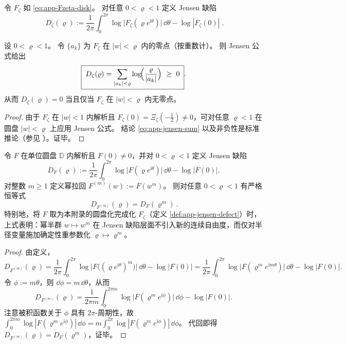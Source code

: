 \begin{definition}[Jensen 缺陷]\label{def:app-jensen-defect}
令 \(F_{\zeta}\) 如 \eqref{eq:app-Fzeta-disk}。
对任意 \(0<\varrho<1\) 定义 Jensen 缺陷
\begin{equation}\label{eq:app-jensen-defect}
\boxed{\;
D_{\zeta}(\varrho)
:=\frac{1}{2\pi}\int_{0}^{2\pi}\log\bigl|F_{\zeta}(\varrho e^{\mathrm{i}\theta})\bigr|\,\dd\theta
-\log|F_{\zeta}(0)|\; }.
\end{equation}
\end{definition}

\begin{proposition}\label{prop:app-jensen-formula-defect}
设 \(0<\varrho<1\)。
令 \(\{a_k\}\) 为 \(F_{\zeta}\) 在 \(|w|<\varrho\) 内的零点（按重数计）。
则 Jensen 公式给出
\begin{equation}\label{eq:app-jensen-sum}
\boxed{\;
D_{\zeta}(\varrho)
=\sum_{|a_k|<\varrho}\log\!\Bigl(\frac{\varrho}{|a_k|}\Bigr)\ \ge\ 0\; }.
\end{equation}
从而 \(D_{\zeta}(\varrho)=0\) 当且仅当 \(F_{\zeta}\) 在 \(|w|<\varrho\) 内无零点。
\end{proposition}
\begin{proof}
由于 \(F_{\zeta}\) 在 \(|w|<1\) 内解析且 \(F_{\zeta}(0)=\Xi_{\zeta}(-\tfrac12)\neq 0\)，可对任意 \(\varrho<1\) 在圆盘 \(|w|<\varrho\) 上应用 Jensen 公式。
结论 \eqref{eq:app-jensen-sum} 以及非负性是标准推论（参见 \cite{Duren1970TheoryHp}）。证毕。
\end{proof}

\begin{proposition}\label{prop:app-jensen-defect-power-covariance}
令 \(F\) 在单位圆盘 \(\mathbb{D}\) 内解析且 \(F(0)\neq 0\)，并对 \(0<\varrho<1\) 定义 Jensen 缺陷
\[
D_F(\varrho):=\frac{1}{2\pi}\int_{0}^{2\pi}\log\bigl|F(\varrho e^{\mathrm{i}\theta})\bigr|\,\dd\theta-\log|F(0)|.
\]
对整数 \(m\ge 1\) 定义幂拉回 \(F^{(m)}(w):=F(w^m)\)。
则对任意 \(0<\varrho<1\) 有严格恒等式
\begin{equation}\label{eq:app-jensen-defect-power-covariance}
\boxed{\ D_{F^{(m)}}(\varrho)=D_F(\varrho^m)\ }.
\end{equation}
特别地，将 \(F\) 取为本附录的圆盘化完成化 \(F_{\zeta}\)（定义 \ref{def:app-jensen-defect}）时，上式表明：幂半群 \(w\mapsto w^m\) 在 Jensen 缺陷层面不引入新的连续自由度，而仅对半径变量施加确定性重参数化 \(\varrho\mapsto \varrho^m\)。
\end{proposition}
\begin{proof}
由定义，
\[
D_{F^{(m)}}(\varrho)
=\frac{1}{2\pi}\int_{0}^{2\pi}\log\bigl|F\!\bigl((\varrho e^{\mathrm{i}\theta})^m\bigr)\bigr|\,\dd\theta-\log|F(0)|
=\frac{1}{2\pi}\int_{0}^{2\pi}\log\bigl|F(\varrho^m e^{\mathrm{i}m\theta})\bigr|\,\dd\theta-\log|F(0)|.
\]
令 \(\phi:=m\theta\)，则 \(\dd\phi=m\,\dd\theta\)，从而
\[
D_{F^{(m)}}(\varrho)
=\frac{1}{2\pi m}\int_{0}^{2\pi m}\log\bigl|F(\varrho^m e^{\mathrm{i}\phi})\bigr|\,\dd\phi-\log|F(0)|.
\]
注意被积函数关于 \(\phi\) 具有 \(2\pi\)-周期性，故
\(
\int_{0}^{2\pi m}\log|F(\varrho^m e^{\mathrm{i}\phi})|\,\dd\phi
=m\int_{0}^{2\pi}\log|F(\varrho^m e^{\mathrm{i}\phi})|\,\dd\phi
\)。
代回即得 \(D_{F^{(m)}}(\varrho)=D_F(\varrho^m)\)，证毕。
\end{proof}

